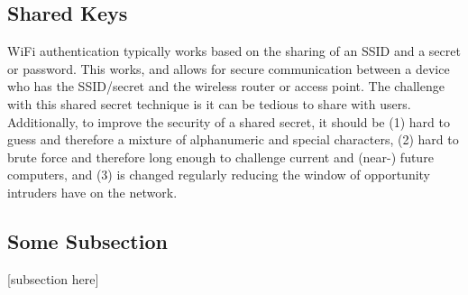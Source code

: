 \subsection{Shared Keys}
WiFi authentication typically works based on the sharing of an SSID and a secret or password.
This works, and allows for secure communication between a device who has the SSID/secret and
the wireless router or access point. The challenge with this shared secret technique is it
can be tedious to share with users. Additionally, to improve the security of a shared secret,
it should be (1) hard to guess and therefore a mixture of alphanumeric and special characters,
(2) hard to brute force and therefore long enough to challenge current and (near-) future computers,
and (3) is changed regularly reducing the window of opportunity intruders have on the network.



\subsection{Some Subsection}
[subsection here]
